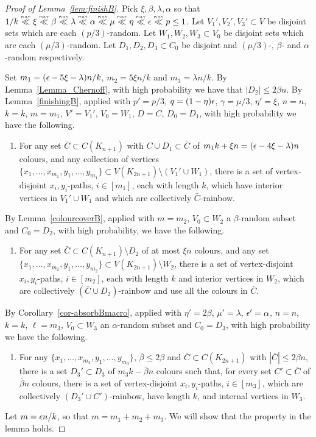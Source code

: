 \begin{proof}[Proof of Lemma~\ref{lem:finishB}]
Pick $\xi,\beta,\lambda,\alpha$ so that $1/k\ll \xi\ll\beta\ll\lambda\ll \alpha\ll \mu\ll \eta\ll \eps\ll p\leq 1$. Let $V_1',V_2',V_3'\subset V$ be disjoint sets which are each $(p/3)$-random. Let $W_1,W_2,W_3\subset V_0$ be disjoint sets which are each $(\mu/3)$-random.
Let $D_1,D_2,D_3\subset C_0$ be disjoint and $(\mu/3)$-, $\beta$- and $\alpha$-random respectively. 

Set $m_1=(\epsilon-5\xi-\lambda)n/k$, $m_2=5\xi n/k$ and $m_3=\lambda n/k$. By Lemma~\ref{Lemma_Chernoff}, with high probability we have that $|D_2|\leq 2\beta n$.
By Lemma~\ref{finishingB}, applied with $p'=p/3$, $q=(1-\eta)\epsilon$, $\gamma=\mu/3$, $\eta'=\xi$, $n=n$, $k=k$, $m=m_1$, $V'=V_1'$, $V_0=W_1$, $D=C$, $D_0=D_1$, with high probability we have the following.
\begin{enumerate}[label = {\bfseries \Alph{propcounter}\arabic{enumi}}]
\item For any set $\bar{C}\subset C(K_{n+1})$ with $C\cup D_1\subset \bar{C}$ of $m_1k+\xi n=(\epsilon-4\xi-\lambda)n$ colours, and any collection of vertices $\{x_1,\ldots,x_{m_1},y_1,\ldots,y_{m_1}\}\subset V(K_{2n+1})\setminus (V_1'\cup W_1)$, there is a set of vertex-disjoint $x_i,y_i$-paths, $i\in [m_1]$, each with length $k$, which have interior vertices in $V_1'\cup W_1$ and which are collectively $\bar{C}$-rainbow.
\label{mouseb11}
\end{enumerate}
 By Lemma~\ref{colourcoverB}, applied with $m=m_2$, $V_0\subset W_2$ a $\beta$-random subset and $C_0=D_2$, with high probability, we have the following.
\begin{enumerate}[label = {\bfseries \Alph{propcounter}\arabic{enumi}}]\addtocounter{enumi}{1}
\item For any set $\bar{C}\subset C(K_{n+1})\setminus D_2$ of at most $\xi n$ colours, and any set $\{x_1,\ldots,x_{m_2},y_1,\ldots,y_{m_2}\}\subset V(K_{2n+1})\setminus W_2$, there is a set of vertex-disjoint $x_i,y_i$-paths, $i\in [{m_2}]$, each with length $k$ and interior vertices in $W_2$, which are collectively $(\bar{C}\cup D_2)$-rainbow and use all the colours in $\bar{C}$.\label{mouseb2}
\end{enumerate}
By Corollary~\ref{cor-absorbBmacro}, applied with $\eta'=2\beta$, $\mu'=\lambda$, $\epsilon'=\alpha$, $n=n$, $k=k$, $\ell=m_3$, $V_0\subset W_3$ an $\alpha$-random subset and $C_0=D_3$, with high probability we have the following.
\begin{enumerate}[label = {\bfseries \Alph{propcounter}\arabic{enumi}}]\addtocounter{enumi}{2}
\item For any $\{x_1,\ldots,x_{m_3},y_1,\ldots,y_{m_3}\}$, $\bar{\beta}\leq 2\beta$ and $\bar{C}\subset C(K_{2n+1})$ with $|\bar{C}|\leq 2\beta n$, there is a set $D_3'\subset D_3$ of $m_3k-\bar{\beta}n$ colours
such that, for every set $C'\subset \bar{C}$ of $\bar{\beta} n$ colours, there is a set of vertex-disjoint $x_i,y_i$-paths, $i\in [m_3]$, which are collectively $(D_3'\cup C')$-rainbow, have length $k$, and internal vertices in $W_3$.\label{mouseb3}
\end{enumerate}
Let $m=\epsilon n/k$, so that $m=m_1+m_2+m_3$. We will show that the property in the lemma holds.


\end{proof}
